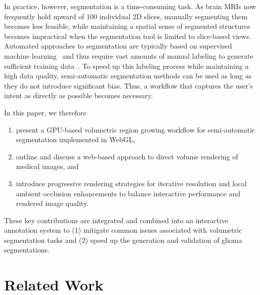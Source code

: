 \documentclass[sigconf]{acmart}
\begin{document}
In practice, however, segmentation is a time-consuming task. 
As brain MRIs now frequently hold upward of $100$ individual 2D slices, manually segmenting them becomes less feasible, while maintaining a spatial sense of segmented structures becomes impractical when the segmentation tool is limited to slice-based views.
Automated approaches to segmentation are typically based on supervised machine learning~\cite{Isensee2019,Zhang2021} and thus require vast amounts of manual labeling to generate sufficient training data~\cite{shen2017DL_med_img}. To speed up this labeling process while maintaining a high data quality, semi-automatic segmentation methods can be used as long as they do not introduce significant bias. Thus, a workflow that captures the user's intent as directly as possible becomes necessary.

In this paper, we therefore
\begin{enumerate}
    \item present a GPU-based volumetric region growing workflow for semi-automatic segmentation implemented in WebGL,
    \item outline and discuss a web-based approach to direct volume rendering of medical images, and
    \item introduce progressive rendering strategies for iterative resolution and local ambient occlusion enhancements to balance interactive performance and rendered image quality.
\end{enumerate}
These key contributions are integrated and combined into an interactive annotation system to (1) mitigate common issues associated with volumetric segmentation tasks and (2) speed up the generation and validation of glioma segmentations.

\section{Related Work}
\label{literature}
\end{document}
